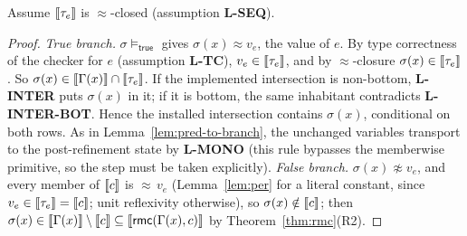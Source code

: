 \documentclass[11pt]{article}
\newcommand{\Env}{\Gamma}
\begin{document}
\begin{lemma}
\label{lem:r-eq-sound}
Assume $\llbracket \tau_e \rrbracket$ is $\approx$-closed (assumption \textbf{L-SEQ}).
\end{lemma}
\begin{proof}
\emph{True branch.} $\sigma \models_{\mathsf{true}}$ gives
$\sigma(x) \approx v_e$, the value of $e$. By type correctness of the
checker for $e$ (assumption \textbf{L-TC}), $v_e \in \llbracket \tau_e \rrbracket$, and by
$\approx$-closure $\sigma(x) \in \llbracket \tau_e \rrbracket$. So
$\sigma(x) \in \sem{\Env(x)} \cap \sem{\tau_e}$. If the implemented
intersection is non-bottom, \textbf{L-INTER} puts $\sigma(x)$ in it; if it
is bottom, the same inhabitant contradicts \textbf{L-INTER-BOT}. Hence the
installed intersection contains $\sigma(x)$, conditional on both rows.
As in Lemma~\ref{lem:pred-to-branch}, the unchanged variables transport to
the post-refinement state by \textbf{L-MONO} (this rule bypasses the
memberwise primitive, so the step must be taken explicitly).
\emph{False branch.} $\sigma(x) \not\approx v_e$, and every member of
$\llbracket c \rrbracket$ is ${\approx}\,v_e$ (Lemma~\ref{lem:per} for a literal constant,
since $v_e \in \llbracket \tau_e \rrbracket = \llbracket c \rrbracket$; unit reflexivity otherwise), so
$\sigma(x) \notin \llbracket c \rrbracket$; then
$\sigma(x) \in \sem{\Env(x)} \setminus \sem{c}
\subseteq \sem{\mathsf{rmc}(\Env(x), c)}$ by Theorem~\ref{thm:rmc}(R2).
\end{proof}
\end{document}
